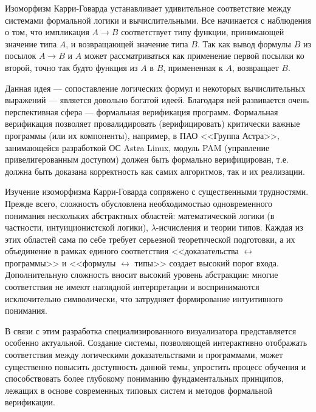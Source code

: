 \documentclass[14pt, russian]{scrartcl}
\begin{document}

\setlength{\tabcolsep}{3pt}
\newpage
\setcounter{page}{2}
\newpage
\renewcommand\contentsname{\hfill{\normalfont{СОДЕРЖАНИЕ}}\hfill}  %
\tableofcontents
\newpage
{}  %

Изоморфизм Карри-Говарда устанавливает удивительное соответствие между системами
формальной логики и вычислительными.  Все начинается с наблюдения о том, что
импликация $A \rightarrow B$ соответствует типу функции, принимающей значение
типа $A$, и возвращающей значение типа $B$. Так как вывод формулы $B$ из посылок
$A \rightarrow B$ и $A$ может рассматриваться как применение первой посылки ко
второй, точно так будто функция из $A$ в $B$, примененная к $A$, возвращает $B$. 

Данная идея --- сопоставление логических формул и некоторых вычислительных
выражений --- является довольно богатой идеей.  Благодаря ней развивается очень
перспективная сфера --- формальная верификация программ. Формальная верификация
позволяет провалидировать (верифицировать) критически важные программы (или их
компоненты), например, в ПАО <<Группа Астра>>, занимающейся разработкой ОС Astra
Linux, модуль PAM (управление привелигерованным доступом) должен быть формально
верифицирован, т.е. должна быть доказана корректность как самих алгоритмов, так и
их реализации.

Изучение изоморфизма Карри-Говарда сопряжено с существенными трудностями. Прежде
всего, сложность обусловлена необходимостью одновременного понимания нескольких
абстрактных областей: математической логики (в частности, интуиционистской
логики), $\lambda$-исчисления и теории типов. Каждая из этих областей сама по
себе требует серьезной теоретической подготовки, а их объединение в рамках
единого соответствия <<доказательства $\leftrightarrow$ программы>> и <<формулы
$\leftrightarrow$ типы>> создает высокий порог входа. Дополнительную сложность
вносит высокий уровень абстракции: многие соответствия не имеют наглядной
интерпретации и воспринимаются исключительно символически, что затрудняет
формирование интуитивного понимания.

В связи с этим разработка специализированного визуализатора представляется
особенно актуальной. Создание системы, позволяющей интерактивно отображать
соответствия между логическими доказательствами и программами, может существенно
повысить доступность данной темы, упростить процесс обучения и способствовать
более глубокому пониманию фундаментальных принципов, лежащих в основе
современных типовых систем и методов формальной верификации.
\end{document}
